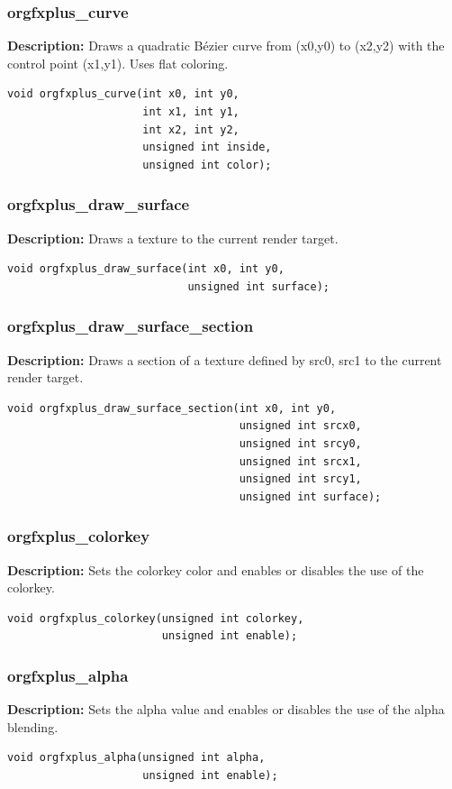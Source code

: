 \documentclass[10pt,a4paper]{article}
\begin{document}
\subsubsection{orgfxplus\_curve}
\textbf{Description:} Draws a quadratic B\'{e}zier curve from (x0,y0) to (x2,y2) with the control point (x1,y1). Uses flat coloring. 
\begin{lstlisting}
void orgfxplus_curve(int x0, int y0, 
                     int x1, int y1, 
                     int x2, int y2,
                     unsigned int inside,
                     unsigned int color);
\end{lstlisting}

\subsubsection{orgfxplus\_draw\_surface}
\textbf{Description:} Draws a texture to the current render target.
\begin{lstlisting}
void orgfxplus_draw_surface(int x0, int y0,
                            unsigned int surface);
\end{lstlisting}

\subsubsection{orgfxplus\_draw\_surface\_section}
\textbf{Description:} Draws a section of a texture defined by src0, src1 to the current render target.
\begin{lstlisting}
void orgfxplus_draw_surface_section(int x0, int y0,
                                    unsigned int srcx0,
                                    unsigned int srcy0,
                                    unsigned int srcx1,
                                    unsigned int srcy1,
                                    unsigned int surface);
\end{lstlisting}


\subsubsection{orgfxplus\_colorkey}
\textbf{Description:} Sets the colorkey color and enables or disables the use of the colorkey.
\begin{lstlisting}
void orgfxplus_colorkey(unsigned int colorkey, 
                        unsigned int enable);
\end{lstlisting}

\subsubsection{orgfxplus\_alpha}
\textbf{Description:} Sets the alpha value and enables or disables the use of the alpha blending.
\begin{lstlisting}
void orgfxplus_alpha(unsigned int alpha, 
                     unsigned int enable);
\end{lstlisting}
\end{document}
